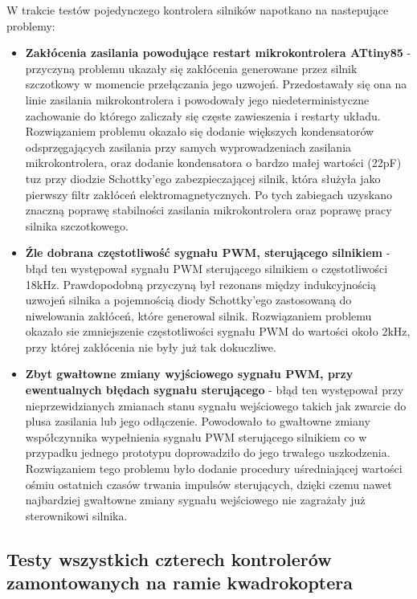 W trakcie testów pojedynczego kontrolera silników napotkano na nastepujące problemy:
\begin{itemize}
	\item \textbf{Zakłócenia zasilania powodujące restart mikrokontrolera ATtiny85} - przyczyną problemu ukazały się zakłócenia generowane przez silnik szczotkowy w momencie przełączania jego uzwojeń. Przedostawały się ona na linie zasilania mikrokontrolera i powodowały jego niedeterministyczne zachowanie do którego zaliczały się częste zawieszenia i restarty układu. Rozwiązaniem problemu okazało się dodanie większych kondensatorów odsprzęgających zasilania przy samych wyprowadzeniach zasilania mikrokontrolera, oraz dodanie kondensatora o bardzo małej wartości (22pF) tuz przy diodzie Schottky'ego zabezpieczającej silnik, która służyła jako pierwszy filtr zakłóceń elektromagnetycznych. Po tych zabiegach uzyskano znaczną poprawę stabilności zasilania mikrokontrolera oraz poprawę pracy silnika szczotkowego.
	\item \textbf{Źle dobrana częstotliwość sygnału PWM, sterującego silnikiem} - błąd ten występował sygnału PWM sterującego silnikiem o częstotliwości 18kHz. Prawdopodobną przyczyną był rezonans między indukcyjnością uzwojeń silnika a pojemnością diody Schottky'ego zastosowaną do niwelowania zakłóceń, które generowal silnik. Rozwiązaniem problemu okazało sie zmniejszenie częstotliwości sygnału PWM do wartości około 2kHz, przy której zakłócenia nie były już tak dokuczliwe.
	\item \textbf{Zbyt gwałtowne zmiany wyjściowego sygnału PWM, przy ewentualnych błędach sygnału sterującego} - błąd ten występował przy nieprzewidzianych zmianach stanu sygnału wejściowego takich jak zwarcie do plusa zasilania lub jego odłączenie. Powodowało to gwałtowne zmiany współczynnika wypełnienia sygnału PWM sterującego silnikiem co w przypadku jednego prototypu doprowadziło do jego trwałego uszkodzenia. Rozwiązaniem tego problemu było dodanie procedury uśredniającej wartości ośmiu ostatnich czasów trwania impulsów sterujących, dzięki czemu nawet najbardziej gwałtowne zmiany sygnału wejściowego nie zagrażały już sterownikowi silnika.
\end{itemize}

\subsection{Testy wszystkich czterech kontrolerów zamontowanych na ramie kwadrokoptera}


